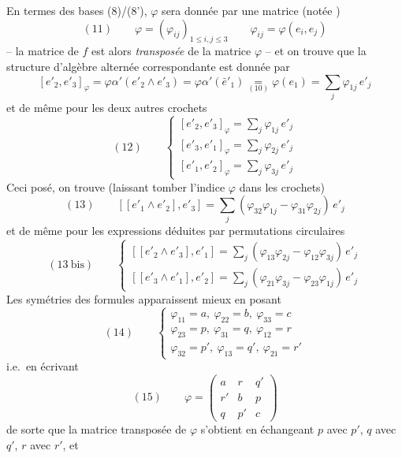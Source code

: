 \documentclass[11pt,a4paper]{article}
\begin{document}
En termes des bases (8)/(8'), $\varphi$ sera donnée par une matrice (notée
\struck{\ill{}})
\[
  (11) \qquad \varphi = (\varphi_{ij})_{1 \leq i, j \leq 3} \qquad \varphi_{ij} = \varphi(e_i, e_j)
\]
-- la matrice de $f$ est alors \emph{transposée} de la matrice $\varphi$ -- et on
trouve que la structure d'algèbre alternée correspondante est donnée par
\[
  [e'_2, e'_3]_{\varphi} = \varphi\alpha'(e'_2 \wedge e'_3) = \varphi\alpha'(\bar{e}'_1) \underset{(10)}{=} \varphi(e_1) = \sum_j \varphi_{1j}\, e'_j
\]
et de même pour les deux autres crochets 
\[
  (12) \qquad
  \begin{cases}
    [e'_2, e'_3]_{\varphi} = \sum_j \varphi_{1j}\, e'_j \\
    [e'_3, e'_1]_{\varphi} = \sum_j \varphi_{2j}\, e'_j \\
    [e'_1, e'_2]_{\varphi} = \sum_j \varphi_{3j}\, e'_j
  \end{cases}
\]
Ceci posé, on trouve (laissant tomber l'indice $\varphi$ dans les crochets)
\[
  (13) \qquad [[e'_1 \wedge e'_2], e'_3] = \sum_j (\varphi_{32}\varphi_{1j} - \varphi_{31}\varphi_{2j})\, e'_j
\]
et de même pour les expressions déduites par permutations circulaires
\[
  (13\ \text{bis}) \qquad
  \begin{cases}
    [[e'_2 \wedge e'_3], e'_1] = \sum_j (\varphi_{13}\varphi_{2j} - \varphi_{12}\varphi_{3j})\, e'_j \\
    [[e'_3 \wedge e'_1], e'_2] = \sum_j (\varphi_{21}\varphi_{3j} - \varphi_{23}\varphi_{1j})\, e'_j
  \end{cases}
\]
Les  symétries des formules apparaissent mieux en posant
\[
  (14) \qquad
  \begin{cases}
    \varphi_{11} = a ,\ \varphi_{22} = b ,\ \varphi_{33} = c \\
    \varphi_{23} = p ,\ \varphi_{31} = q ,\ \varphi_{12} = r \\
    \varphi_{32} = p' ,\ \varphi_{13} = q' ,\ \varphi_{21} = r'
  \end{cases}
\]
i.e.\ en écrivant
\[
  (15) \qquad \varphi = \begin{pmatrix} a & r & q' \\ r' & b & p \\ q & p' & c \end{pmatrix}
\]
de sorte que la matrice transposée de $\varphi$ s'obtient en échangeant $p$ avec
$p'$, $q$ avec $q'$, $r$ avec $r'$, et
\end{document}
